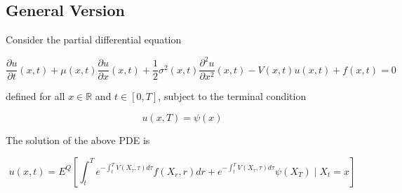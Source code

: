 \documentclass[a4]{article}
\begin{document}
\subsection{General Version}
Consider the partial differential equation\par 
$$
\frac{\partial u}{\partial t}(x, t)+\mu(x, t) \frac{\partial u}{\partial x}(x, t)+\frac{1}{2} \sigma^{2}(x, t) \frac{\partial^{2} u}{\partial x^{2}}(x, t)-V(x, t) u(x, t)+f(x, t)=0
$$\par 
\noindent defined for all $x\in \mathbb{R}$ and $t\in[0,T]$, subject to the terminal condition\par 
$$
u(x, T)=\psi(x)
$$\par 
\noindent The solution of the above PDE is \par 
$$
u(x, t)=E^{Q}\left[\int_{t}^{T} e^{-\int_{t}^{T} V\left(X_{\tau}, \tau\right) d \tau} f\left(X_{r}, r\right) d r+e^{-\int_{t}^{T} V\left(X_{\tau}, \tau\right) d \tau} \psi\left(X_{T}\right) \mid X_{t}=x\right]
$$\par 
\bigbreak 
\bigbreak
\end{document}
